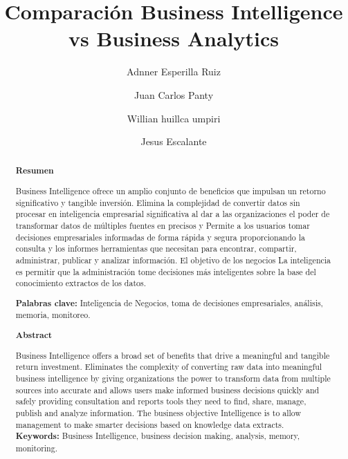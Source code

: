\documentclass[%
 reprint,
 amsmath,amssymb,
 aps,
]{revtex4-1}
\begin{document}
\title{Comparación Business Intelligence vs Business Analytics}
\author{Adnner Esperilla Ruiz}
\author{Juan Carlos Panty }
\author{Willian huillca umpiri }
\author{Jesus Escalante}

%

\begin{abstract}
\begin{center}
\textbf{Resumen}
\end{center}

Business Intelligence ofrece un amplio conjunto de beneficios que impulsan un retorno significativo y tangible
inversión. Elimina la complejidad de convertir datos sin procesar en inteligencia empresarial significativa al dar a las organizaciones el poder de transformar datos de múltiples fuentes en precisos y Permite a los usuarios
tomar decisiones empresariales informadas de forma rápida y segura proporcionando la consulta y los informes
herramientas que necesitan para encontrar, compartir, administrar, publicar y analizar información. El objetivo de los negocios
La inteligencia es permitir que la administración tome decisiones más inteligentes sobre la base del conocimiento
extractos de los datos.

\textbf{Palabras clave:}  Inteligencia de Negocios, toma de decisiones empresariales, análisis, memoria, monitoreo.\\
\begin{center}
\textbf{Abstract}
\end{center}
Business Intelligence offers a broad set of benefits that drive a meaningful and tangible return
investment. Eliminates the complexity of converting raw data into meaningful business intelligence by giving organizations the power to transform data from multiple sources into accurate and allows users
make informed business decisions quickly and safely providing consultation and reports
tools they need to find, share, manage, publish and analyze information. The business objective
Intelligence is to allow management to make smarter decisions based on knowledge
data extracts.
\\

\textbf{Keywords:}  Business Intelligence, business decision making, analysis, memory, monitoring.\\
\end{abstract}

\maketitle
\end{document}
